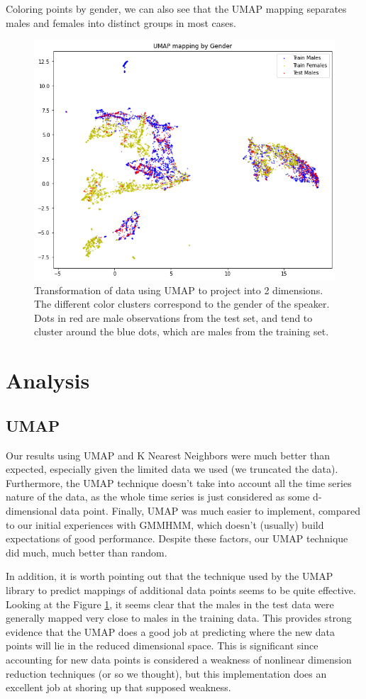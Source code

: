 \documentclass[11pt]{article}
\newcommand{\0}{{\vec  0 }}
\newcommand{\1}{{\mathbbm{  1} }}
\begin{document}
    
    Coloring points by gender, we can also see that the UMAP mapping separates males and females into distinct groups in most cases. 
   
    \begin{figure}
        \centering
        \includegraphics[width=0.7\linewidth]{UMAPGenderCompare}
        \caption{Transformation of data using UMAP to project into 2 dimensions. The different color clusters correspond to the gender of the speaker. Dots in red are male observations from the test set, and tend to cluster around the blue dots, which are males from the training set.}
        \label{fig:umapgendercompare}
    \end{figure}
    
    \section{Analysis}
    
    \subsection{UMAP}
    Our results using UMAP and K Nearest Neighbors were much better than expected, especially given the limited data we used (we truncated the data). Furthermore, the UMAP technique doesn’t take into account all the time series nature of the data, as the whole time series is just considered as some d-dimensional data point. Finally, UMAP was much easier to implement, compared to our initial experiences with GMMHMM, which doesn’t (usually) build expectations of good performance. Despite these factors, our UMAP technique did much, much better than random. 
    
    In addition, it is worth pointing out that the technique used by the UMAP library to predict mappings of additional data points seems to be quite effective. Looking at the Figure \ref{fig:umapgendercompare}, it seems clear that the males in the test data were generally mapped very close to males in the training data. This provides strong evidence that the UMAP does a good job at predicting where the new data points will lie in the reduced dimensional space. This is significant since accounting for new data points is considered a weakness of nonlinear dimension reduction techniques (or so we thought), but this implementation does an excellent job at shoring up that supposed weakness. 
    
\end{document}
